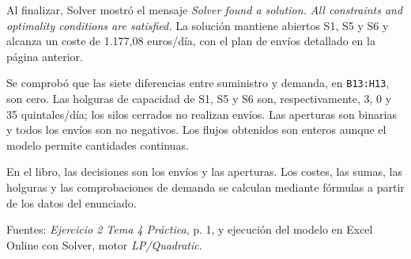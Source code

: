 \documentclass[11pt,a4paper]{article}
\begin{document}
Al finalizar, Solver mostró el mensaje \emph{Solver found a solution. All constraints and
optimality conditions are satisfied.} La solución mantiene abiertos S1, S5 y S6 y alcanza
un coste de 1.177,08 euros/día, con el plan de envíos detallado en la página anterior.

Se comprobó que las siete diferencias entre suministro y demanda, en \texttt{B13:H13},
son cero. Las holguras de capacidad de S1, S5 y S6 son, respectivamente, 3, 0 y 35
quintales/día; los silos cerrados no realizan envíos. Las aperturas son binarias y todos
los envíos son no negativos. Los flujos obtenidos son enteros aunque el modelo permite
cantidades continuas.

En el libro, las decisiones son los envíos y las aperturas. Los costes, las sumas, las
holguras y las comprobaciones de demanda se calculan mediante fórmulas a partir de
los datos del enunciado.

\small Fuentes: \emph{Ejercicio 2 Tema 4 Práctica}, p. 1, y ejecución del modelo en Excel
Online con Solver, motor \emph{LP/Quadratic}.
\end{document}
